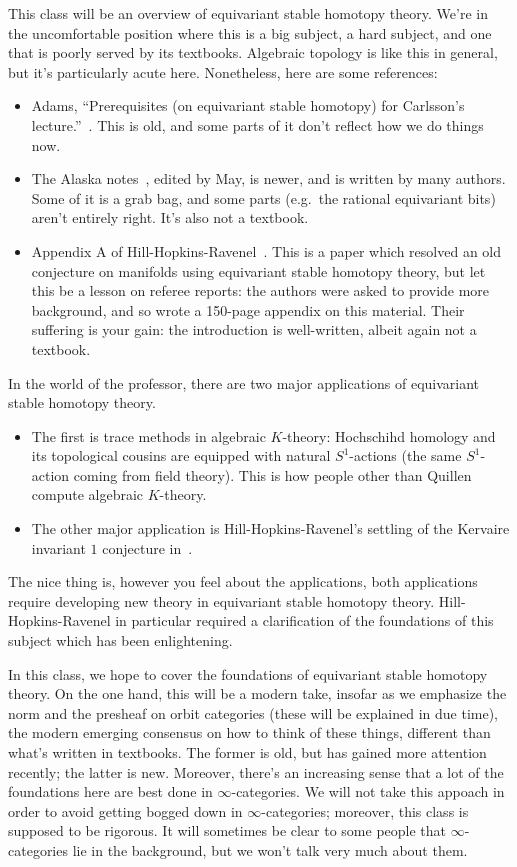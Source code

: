 This class will be an overview of equivariant stable homotopy theory. We're in the uncomfortable position where
this is a big subject, a hard subject, and one that is poorly served by its textbooks. Algebraic topology is like
this in general, but it's particularly acute here. Nonetheless, here are some references:
\begin{itemize}
	\item Adams, ``Prerequisites (on equivariant stable homotopy) for Carlsson's lecture.''~\cite{Adams84}. This is
	old, and some parts of it don't reflect how we do things now.
	\item The Alaska notes~\cite{AlaskaNotes}, edited by May, is newer, and is written by many authors. Some of it
	is a grab bag, and some parts (e.g.\ the rational equivariant bits) aren't entirely right. It's also not a
	textbook.
	\item Appendix A of Hill-Hopkins-Ravenel~\cite{HHR}. This is a paper which resolved an old conjecture on
	manifolds using equivariant stable homotopy theory, but let this be a lesson on referee reports: the authors
	were asked to provide more background, and so wrote a 150-page appendix on this material. Their suffering is
	your gain: the introduction is well-written, albeit again not a textbook.
\end{itemize}
In the world of the professor, there are two major applications of equivariant stable homotopy theory.
\begin{itemize}
	\item The first is trace methods in algebraic $K$-theory: Hochschihd homology and its topological cousins are
	equipped with natural $S^1$-actions (the same $S^1$-action coming from field theory). This is how people
	other than Quillen compute algebraic $K$-theory.
	\item The other major application is Hill-Hopkins-Ravenel's settling of the Kervaire invariant $1$ conjecture
	in~\cite{HHR}.
\end{itemize}
The nice thing is, however you feel about the applications, both applications require developing new theory in
equivariant stable homotopy theory. Hill-Hopkins-Ravenel in particular required a clarification of the foundations
of this subject which has been enlightening.

In this class, we hope to cover the foundations of equivariant stable homotopy theory. On the one hand, this will
be a modern take, insofar as we emphasize the norm and the presheaf on orbit categories (these will be explained in
due time), the modern emerging consensus on how to think of these things, different than what's written in
textbooks. The former is old, but has gained more attention recently; the latter is new. Moreover, there's an
increasing sense that a lot of the foundations here are best done in $\infty$-categories. We will not take this
appoach in order to avoid getting bogged down in $\infty$-categories; moreover, this class is supposed to be
rigorous. It will sometimes be clear to some people that $\infty$-categories lie in the background, but we won't
talk very much about them.

